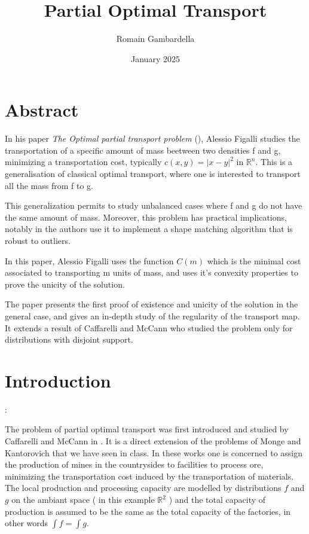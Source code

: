 \documentclass[a4paper,11pt]{article}
\title{Partial Optimal Transport}
\author{Romain Gambardella}
\date{January 2025}
\theoremstyle{definition}
\begin{document}
\maketitle

\section{Abstract}

In his paper \textit{The Optimal partial transport problem} (\cite{fig}), Alessio Figalli studies the transportation of a specific amount of mass beetween two densities f and g, minimizing a transportation cost, typically $c(x,y) = |x-y|^2$ in $\mathbb{R}^n$. This is a generalisation of classical optimal transport, where one is interested to transport all the mass from f to g.

This generalization permits to study unbalanced cases where f and g do not have the same amount of mass. Moreover, this problem has practical implications, notably in \cite{SPOT} the authors use it to implement a shape matching algorithm that is robust to outliers.

In this paper, Alessio Figalli uses the function $C(m)$ which is the minimal cost associated to transporting m units of mass, and uses it's convexity properties to prove the unicity of the solution. 

The paper presents the first proof of existence and unicity of the solution in the general case, and gives an in-depth study of the regularity of the transport map. It extends a result of Caffarelli and McCann who studied the problem only for distributions with disjoint support.
\section{Introduction}:

The problem of partial optimal transport was first introduced and studied by Caffarelli and McCann in \cite{caff}. 
It is a direct extension of the problems of Monge \cite{monge} and Kantorovich \cite{Kant} that we have seen in class. In these works one is concerned to assign the production of mines in the countrysides to facilities to process ore, minimizing the transportation cost induced by the transportation of materials. The local production and processing capacity are modelled by distributions $f$ and $g$ on the ambiant space ( in this example $\mathbb R^2$ ) and the total capacity of production is assumed to be the same as the total capacity of the factories, in other words $\int f = \int g$. \\
\end{document}
